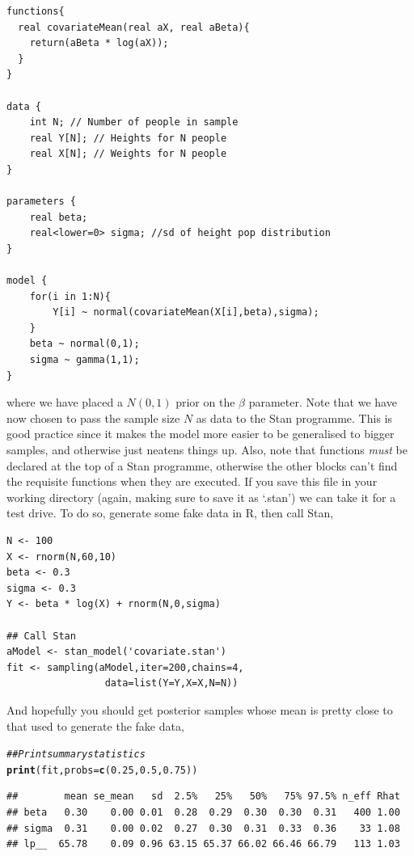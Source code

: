 \documentclass[11pt,fullpage]{book}
\makeatletter
\newenvironment{kframe}{%
	\def\at@end@of@kframe{}%
	\ifinner\ifhmode%
	\def\at@end@of@kframe{\end{minipage}}%
\begin{minipage}{\columnwidth}%
	\fi\fi%
	\def\FrameCommand##1{\hskip\@totalleftmargin \hskip-\fboxsep
		\colorbox{shadecolor}{##1}\hskip-\fboxsep
		\hskip-\linewidth \hskip-\@totalleftmargin \hskip\columnwidth}%
	\MakeFramed {\advance\hsize-\width
		\@totalleftmargin\z@ \linewidth\hsize
		\@setminipage}}%
{\par\unskip\endMakeFramed%
	\at@end@of@kframe}
\newcommand{\hlnum}[1]{\textcolor[rgb]{0.686,0.059,0.569}{#1}}%
\newcommand{\hlcom}[1]{\textcolor[rgb]{0.678,0.584,0.686}{\textit{#1}}}%
\newcommand{\hlstd}[1]{\textcolor[rgb]{0.345,0.345,0.345}{#1}}%
\newcommand{\hlkwc}[1]{\textcolor[rgb]{0.333,0.667,0.333}{#1}}%
\newcommand{\hlkwd}[1]{\textcolor[rgb]{0.737,0.353,0.396}{\textbf{#1}}}%
\newenvironment{knitrout}{}{} %
\makeatother
\begin{document}
\begin{verbatim}
functions{
  real covariateMean(real aX, real aBeta){
    return(aBeta * log(aX));
  }
}

data {
    int N; // Number of people in sample
    real Y[N]; // Heights for N people
    real X[N]; // Weights for N people
}

parameters {
    real beta;
    real<lower=0> sigma; //sd of height pop distribution
}

model {
    for(i in 1:N){
        Y[i] ~ normal(covariateMean(X[i],beta),sigma);
    }
    beta ~ normal(0,1);
    sigma ~ gamma(1,1);
}
\end{verbatim}
where we have placed a $N(0,1)$ prior on the $\beta$ parameter. Note that we have now chosen to pass the sample size $N$ as data to the Stan programme. This is good practice since it makes the model more easier to be generalised to bigger samples, and otherwise just neatens things up. Also, note that functions \textit{must} be declared at the top of a Stan programme, otherwise the other blocks can't find the requisite functions when they are executed. If you save this file in your working directory (again, making sure to save it as `.stan') we can take it for a test drive. To do so, generate some fake data in R, then call Stan,
\begin{verbatim}
N <- 100
X <- rnorm(N,60,10)
beta <- 0.3
sigma <- 0.3
Y <- beta * log(X) + rnorm(N,0,sigma)

## Call Stan
aModel <- stan_model('covariate.stan')
fit <- sampling(aModel,iter=200,chains=4,
                 data=list(Y=Y,X=X,N=N))
\end{verbatim}
And hopefully you should get posterior samples whose mean is pretty close to that used to generate the fake data,

\begin{knitrout}\small
		\color{fgcolor}\begin{kframe}
			\begin{alltt}
				\hlcom{## Print summary statistics}
				\hlkwd{print}\hlstd{(fit,}\hlkwc{probs} \hlstd{=} \hlkwd{c}\hlstd{(}\hlnum{0.25}\hlstd{,} \hlnum{0.5}\hlstd{,} \hlnum{0.75}\hlstd{))}
			\end{alltt}
			\begin{verbatim}
##        mean se_mean   sd  2.5%   25%   50%   75% 97.5% n_eff Rhat
## beta   0.30    0.00 0.01  0.28  0.29  0.30  0.30  0.31   400 1.00
## sigma  0.31    0.00 0.02  0.27  0.30  0.31  0.33  0.36    33 1.08
## lp__  65.78    0.09 0.96 63.15 65.37 66.02 66.46 66.79   113 1.03
			\end{verbatim}
		\end{kframe}
	\end{knitrout}
\end{document}
